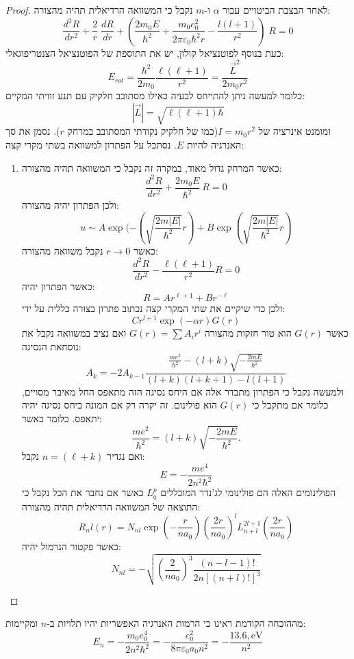 \documentclass{tstextbook}
\begin{document}
\begin{proof}
לאחר הבצבת הביטויים עבור \(\alpha\) ו-\(m\) נקבל כי המשוואה הרדיאלית תהיה מהצורה:
$${\frac{d^{2}R}{d r^{2}}}+{\frac{2}{r}}\;{\frac{d R}{d r}}+\left({\frac{2m_{0}E}{\hbar^{2}}}+{\frac{m_{0}e_{0}^{2}}{2\pi\varepsilon_{0}\hbar^{2}r}}-{\frac{l\left(l+1\right)}{r^{2}}}\right)\;R=0$$
כעת בנוסף לפוטנציאל קולון, יש את התוספת של הפוטנציאל הצנטריפוגאלי:
$$E_{r o t}=\frac{\hbar^{2}}{2m_{0}}\frac{\ell\left(\ell+1\right)}{r^{2}}=\frac{\vec{L}^{2}}{2m_{0}r^{2}}$$
כלומר למעשה ניתן להתייחס לבעיה כאילו מסתובב חלקיק עם תנע זוויתי המקיים:
$$\left\lvert  \vec{L}  \right\rvert = \sqrt{ \ell\left( \ell+1 \right)\hbar }$$
ומומנט אינרציה של \(I=m_{0}r^{2}\)(כמו של חלקיק נקודתי המסתובב במרחק \(r\)). נסמן את סך האנרגיה להיות \(E\). נסתכל על הפתרון למשוואה בשתי מקרי קצה:

  \begin{enumerate}
    \item כאשר המרחק גדול מאוד, במקרה זה נקבל כי המשוואה תהיה מהצורה: 
$$\frac{d^{2}R}{d r^{2}}+\frac{2m_{0}E}{\hbar^{2}}\ R=0$$
ולכן הפתרון יהיה מהצורה:
$$u\sim A\exp(-\left(\sqrt{\frac{2m|E|}{\hbar^{2}}}r\right)+B\exp\left(\sqrt{\frac{2m|E|}{\hbar^{2}}}r\right)$$
כאשר \(r\to 0\) נקבל משוואה מהצורה:
$${\frac{d^{2}R}{d r^{2}}}-{\frac{\ell\left( \ell+1 \right)}{r^{2}}}R=0$$
כאשר הפתרון יהיה:
$$R = A r^{\ell+1}+Br ^{-\ell}$$
ולכן כדי שיקיים את שתי המקרי קצה נכתוב פתרון בצורה כללית על ידי:
$$C r^{l+1}\exp(-\alpha r)G(r)$$
כאשר \(G(r)\) הוא טור חזקות מהצורה \(G(r)=\sum A_{i}r^{i}\) ואם נציב במשוואה נקבל את נוסחאת הנסיגה:
$$A_{k}=-2A_{k-1}\frac{\frac{m e^{2}}{\hbar^{2}}-(l+k)\sqrt{-\frac{2m E}{\hbar^{2}}}}{(l+k)(l+k+1)-l(l+1)}$$
ולמעשה נקבל כי הפתרון מתבדר אלה אם היחס נסיגה הזה מתאפס החל מאיבר מסויים, כלומר אם מתקבל כי \(G(r)\) הוא פולינום. זה יקרה רק אם המונה ביחס נסיגה יהיה יתאפס. כלומר כאשר:
$$\frac{m e^{2}}{\hbar^{2}}=(l+k)\sqrt{-\frac{2m E}{\hbar^{2}}}.$$
ואם נגדיר \(n=\left( \ell+k \right)\) נקבל:
$$E=-{\frac{m e^{4}}{2n^{2}\hbar^{2}}}$$
הפולינומים האלה הם פולינומי לג'נדר המוכללים \(L_{q}^{p}\) כאשר אם נחבר את הכל נקבל כי התוצאה של המשוואה הרדיאלית תהיה מהצורה:
$$R_{n}l(r)=N_{n l}\exp\left( -\frac{r}{n a_{0} }\right)\left( \frac{2r}{n a_{0}} \right)^{l}L_{n+l}^{2l+1}\left( \frac{2r}{n a_{0}} \right)$$
כאשר פקטור הנרמול יהיה:
$$N_{n l}=-\sqrt{\left(\frac{2}{n a_{0}}\right)^{3}\frac{(n-l-1)!}{2n[(n+l)!]^{3}}}$$
  \end{enumerate}
\end{proof}
\begin{corollary}
מההוכחה הקודמת ראינו כי הרמות האנרגיה האפשריות יהיו תלויות ב-\(n\) ומקיימות:
$$ E_{n} = -{\frac{m_{0} e_{0}^{4}}{2n^{2}\hbar^{2}}} = -\frac{e_{0}^{2}}{8\pi\varepsilon_{0}a_{0}n^{2}} = -\frac{13.6 , \mathrm{eV}}{n^{2}} $$

\end{corollary}
\end{document}
